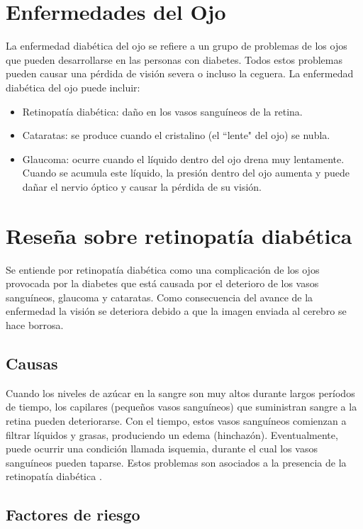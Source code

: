 \section{Enfermedades del Ojo}
La enfermedad diabética del ojo se refiere a un grupo de problemas de los ojos que pueden desarrollarse en las personas con diabetes. Todos estos problemas pueden causar una pérdida de visión severa o incluso la ceguera.
La enfermedad diabética del ojo puede incluir:
\begin{itemize}
\item Retinopatía diabética: daño en los vasos sanguíneos de la retina.

\item Cataratas: se produce cuando el cristalino (el ``lente" del ojo) se nubla.

\item Glaucoma: ocurre cuando el líquido dentro del ojo drena muy lentamente. Cuando se acumula este líquido, la presión dentro del ojo aumenta y puede dañar el nervio óptico y causar la pérdida de su visión.
\end{itemize}
\section{Reseña sobre retinopatía diabética}
Se entiende por retinopatía diabética como una complicación de los ojos provocada por la diabetes que está causada por el deterioro de los vasos sanguíneos, glaucoma y cataratas. Como consecuencia del avance de la enfermedad la visión se deteriora debido a que la imagen enviada al cerebro se hace borrosa. 

\subsection{Causas}



Cuando los niveles de azúcar en la sangre son muy altos durante largos períodos de tiempo, los capilares (pequeños vasos sanguíneos) que suministran sangre a la retina pueden deteriorarse. Con el tiempo, estos vasos sanguíneos comienzan a filtrar líquidos y grasas, produciendo un edema (hinchazón). Eventualmente, puede ocurrir una condición llamada isquemia, durante el cual los vasos sanguíneos pueden taparse. Estos problemas son asociados a la presencia de la retinopatía diabética \cite{AAOcausas}.

\subsection{Factores de riesgo}


